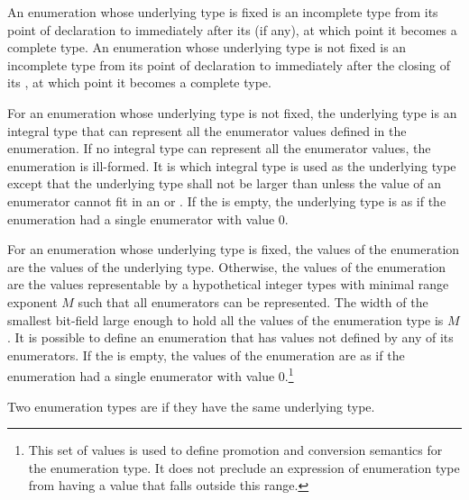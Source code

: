 \pnum
An enumeration whose underlying type is fixed is an incomplete type from its
point of declaration to immediately after its
 (if any), at which point it becomes a complete type.
An enumeration whose underlying type is not fixed is an incomplete type from
its point of declaration to immediately after the closing \tcode{\}} of its
, at which point it becomes a complete type.

\pnum
For an enumeration whose underlying type is not fixed,
the underlying type
is an
integral type that can represent all the enumerator values defined in
the enumeration. If no integral type can represent all the enumerator
values, the enumeration is ill-formed. It is 
which integral type is used as the underlying type
except that the underlying type shall not be larger than 
unless the value of an enumerator cannot fit in an  or
. If the  is empty, the
underlying type is as if the enumeration had a single enumerator with
value 0.

\pnum
{}%
For an enumeration whose underlying type is fixed, the values of
the enumeration are the values of the underlying type. Otherwise,
the values of the enumeration are the values representable by
a hypothetical integer types with minimal range exponent $M$
such that all enumerators can be represented.
The width of the smallest bit-field large enough to hold all the values of the
enumeration type is $M$.
It is possible to define an enumeration that has values not defined by
any of its enumerators. If the  is empty, the
values of the enumeration are as if the enumeration had a single enumerator with
value 0.\footnote{This set of values is used to define promotion and
conversion semantics for the enumeration type. It does not preclude an
expression of enumeration type from having a value that falls outside
this range.}

\pnum
Two enumeration types are 
if they have the same underlying type.

